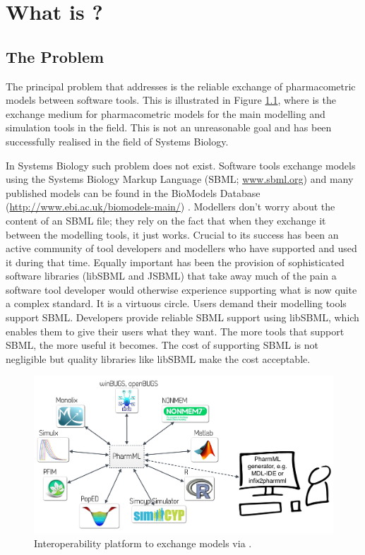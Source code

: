\newcommand{\matlab}{MATLAB\textsuperscript{\textregistered}}
\chapter{What is \pharmml?}
\label{chap:pharmml-what}

\section{The Problem}

The principal problem that \pharmml addresses is the reliable exchange of pharmacometric 
models between software tools. This is illustrated in Figure \ref{fig:platformDDMoRe}, where 
\pharmml is the exchange medium
for pharmacometric models for the main modelling and simulation tools in the field. This is
not an unreasonable goal and has been successfully realised in the field of Systems Biology.

In Systems Biology such problem does not exist. Software
tools exchange models using the Systems Biology Markup Language (SBML; \url{www.sbml.org})
\cite{SBML} and many published models can be found in the BioModels Database
(\url{http://www.ebi.ac.uk/biomodels-main/}) \cite{BioModels2010}. Modellers don't worry about the
content of an SBML file; they rely on the fact that when they exchange it between the
modelling tools, it just works. Crucial to its success has been an active community of tool
developers and modellers who have supported and used it during
that time. Equally important has been the provision of sophisticated software libraries (libSBML
and JSBML) that take away much of the pain a software tool developer would otherwise experience
supporting what is now quite a complex standard. It is a virtuous circle. Users demand their
modelling tools support SBML\@. Developers provide reliable SBML support using libSBML, which
enables them to give their users what they want. The more tools that support SBML, the more useful
it becomes. The cost of supporting SBML is not negligible but quality libraries like libSBML make
the cost acceptable.

\begin{figure}[htb]
\centering
  \includegraphics[width=0.95\linewidth]{pics/platformDDMoRe.pdf}
 \caption{Interoperability platform to exchange models via \pharmml.}
 \label{fig:platformDDMoRe}
\end{figure}

